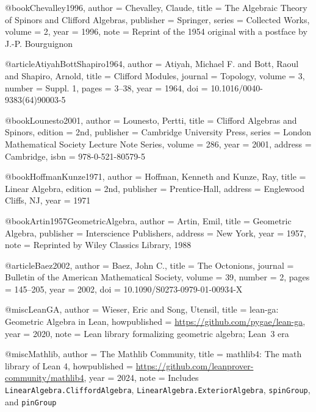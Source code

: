 \documentclass[11pt,a4paper]{article}
\theoremstyle{plain}
\theoremstyle{definition}
\theoremstyle{remark}
\begin{document}
@book{Chevalley1996,
  author    = {Chevalley, Claude},
  title     = {The Algebraic Theory of Spinors and Clifford Algebras},
  publisher = {Springer},
  series    = {Collected Works},
  volume    = {2},
  year      = {1996},
  note      = {Reprint of the 1954 original with a postface by J.-P. Bourguignon}
}

@article{AtiyahBottShapiro1964,
  author  = {Atiyah, Michael F. and Bott, Raoul and Shapiro, Arnold},
  title   = {Clifford Modules},
  journal = {Topology},
  volume  = {3},
  number  = {Suppl. 1},
  pages   = {3--38},
  year    = {1964},
  doi     = {10.1016/0040-9383(64)90003-5}
}

@book{Lounesto2001,
  author    = {Lounesto, Pertti},
  title     = {Clifford Algebras and Spinors},
  edition   = {2nd},
  publisher = {Cambridge University Press},
  series    = {London Mathematical Society Lecture Note Series},
  volume    = {286},
  year      = {2001},
  address   = {Cambridge},
  isbn      = {978-0-521-80579-5}
}

@book{HoffmanKunze1971,
  author    = {Hoffman, Kenneth and Kunze, Ray},
  title     = {Linear Algebra},
  edition   = {2nd},
  publisher = {Prentice-Hall},
  address   = {Englewood Cliffs, NJ},
  year      = {1971}
}

@book{Artin1957GeometricAlgebra,
  author    = {Artin, Emil},
  title     = {Geometric Algebra},
  publisher = {Interscience Publishers},
  address   = {New York},
  year      = {1957},
  note      = {Reprinted by Wiley Classics Library, 1988}
}

@article{Baez2002,
  author  = {Baez, John C.},
  title   = {The Octonions},
  journal = {Bulletin of the American Mathematical Society},
  volume  = {39},
  number  = {2},
  pages   = {145--205},
  year    = {2002},
  doi     = {10.1090/S0273-0979-01-00934-X}
}

@misc{LeanGA,
  author       = {Wieser, Eric and Song, Utensil},
  title        = {{lean-ga}: Geometric Algebra in {Lean}},
  howpublished = {\url{https://github.com/pygae/lean-ga}},
  year         = {2020},
  note         = {Lean library formalizing geometric algebra; Lean~3 era}
}

@misc{Mathlib,
  author       = {{The Mathlib Community}},
  title        = {{mathlib4}: The math library of {Lean} 4},
  howpublished = {\url{https://github.com/leanprover-community/mathlib4}},
  year         = {2024},
  note         = {Includes {\tt LinearAlgebra.CliffordAlgebra},
                  {\tt LinearAlgebra.ExteriorAlgebra},
                  {\tt spinGroup}, and {\tt pinGroup}}
}
\end{document}
